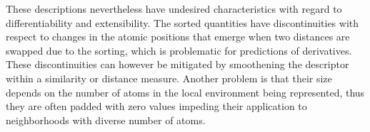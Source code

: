 These descriptions nevertheless have undesired characteristics with regard to differentiability and extensibility.
The sorted quantities have discontinuities with respect to changes in the atomic positions that emerge when two distances are swapped due to the sorting, which is problematic for predictions of derivatives.
These discontinuities can however be mitigated by smoothening the descriptor within a similarity or distance measure.
Another problem is that their size depends on the number of atoms in the local environment being represented, thus they are often padded with zero values impeding their application to neighborhoods with diverse number of atoms.


%

